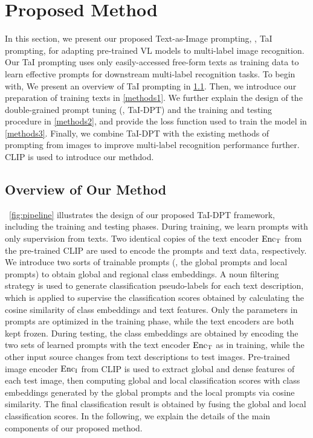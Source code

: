 \documentclass[10pt,twocolumn,letterpaper]{article}
\begin{document}
\section{Proposed Method}
\label{sec:method}
In this section, we present our proposed Text-as-Image prompting, \ie, TaI prompting, for adapting pre-trained VL models to multi-label image recognition. 
Our TaI prompting uses only easily-accessed free-form texts as training data to learn effective prompts for downstream multi-label recognition tasks. 
To begin with, We present an overview of TaI prompting in \cref{methods0}. 
Then, we introduce our preparation of training texts in \cref{methods1}. 
We further explain the design of the double-grained prompt tuning (\ie, TaI-DPT) and the training and testing procedure in \cref{methods2}, and provide the loss function used to train the model in \cref{methods3}.
Finally, we combine TaI-DPT with the existing methods of prompting from images to improve multi-label recognition performance further.
CLIP is used to introduce our methdod.

\subsection{Overview of Our Method}
\label{methods0}
~\cref{fig:pipeline} illustrates the design of our proposed TaI-DPT framework, including the training and testing phases. 
During training, we learn prompts with only supervision from texts. Two identical copies of the text encoder ${\rm Enc_T}$ from the pre-trained CLIP are used to encode the prompts and text data, respectively. 
We introduce two sorts of trainable prompts (\ie, the global prompts and local prompts) to obtain global and regional class embeddings.
A noun filtering strategy is used to generate classification pseudo-labels for each text description, which is applied to supervise the classification scores obtained by calculating the cosine similarity of class embeddings and text features. 
Only the parameters in prompts are optimized in the training phase, while the text encoders are both kept frozen.
During testing, the class embeddings are obtained by encoding the two sets of learned prompts with the text encoder ${\rm Enc_T}$ as in training, while the other input source changes from text descriptions to test images. 
Pre-trained image encoder ${\rm Enc_I}$ from CLIP is used to extract global and dense features of each test image, then computing global and local classification scores with class embeddings generated by the global prompts and the local prompts via cosine similarity. 
The final classification result is obtained by fusing the global and local classification scores.
In the following, we explain the details of the main components of our proposed method.
\end{document}
